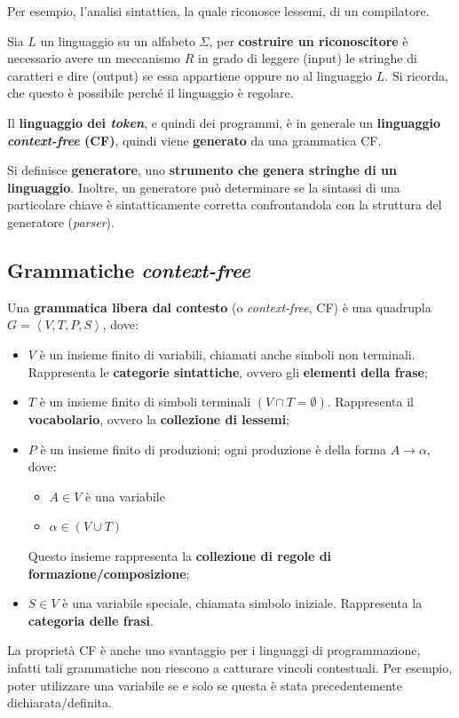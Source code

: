 \documentclass[a4paper]{article}
\begin{document}
	\noindent
	Per esempio, l'analisi sintattica, la quale riconosce lessemi, di un compilatore.\newline

	\noindent
	Sia $L$ un linguaggio su un alfabeto $\Sigma$, per \textbf{costruire un riconoscitore} è necessario avere un meccanismo $R$ in grado di leggere (input) le stringhe di caratteri e dire (output) se essa appartiene oppure no al linguaggio $L$. Si ricorda, che questo è possibile perché il linguaggio è regolare.\newline

	\noindent
	Il \textbf{linguaggio dei \emph{token}}, e quindi dei programmi, è in generale un \textbf{linguaggio \emph{context-free} (CF)}, quindi viene \textbf{generato} da una grammatica CF.
	\begin{boxdef}
		Si definisce \textcolor{Red3}{\textbf{generatore}}, uno \textbf{strumento che genera stringhe di un linguaggio}. Inoltre, un generatore può determinare se la sintassi di una particolare chiave è sintatticamente corretta confrontandola con la struttura del generatore (\emph{parser}).
	\end{boxdef}\newpage

	\subsection{Grammatiche \emph{context-free}}

	Una \textcolor{Red3}{\textbf{grammatica libera dal contesto}} (o \emph{context-free}, CF) è una quadrupla $G = \left\langle V, T, P, S \right\rangle$, dove:
	\begin{itemize}
		\item $V$ è un insieme finito di variabili, chiamati anche simboli non terminali. Rappresenta le \textbf{categorie sintattiche}, ovvero gli \textbf{elementi della frase};
		\item $T$ è un insieme finito di simboli terminali $\left(V \cap T = \emptyset\right)$. Rappresenta il \textbf{vocabolario}, ovvero la \textbf{collezione di lessemi};
		\item $P$ è un insieme finito di produzioni; ogni produzione è della forma $A \rightarrow \alpha$, dove:
		\begin{itemize}
			\item $A \in V$ è una variabile
			\item $\alpha \in \left(V \cup T\right)$
		\end{itemize}
		Questo insieme rappresenta la \textbf{collezione di regole di formazione/composizione};
		\item $S \in V$ è una variabile speciale, chiamata simbolo iniziale. Rappresenta la \textbf{categoria delle frasi}.
	\end{itemize}
	La proprietà CF è anche uno svantaggio per i linguaggi di programmazione, infatti tali grammatiche non riescono a catturare vincoli contestuali. Per esempio, poter utilizzare una variabile se e solo se questa è stata precedentemente dichiarata/definita.\newpage
\end{document}
